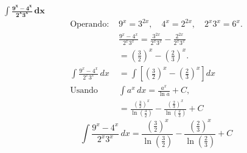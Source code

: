 $\displaystyle \mathbf{\int \frac{9^{x} - 4^{x}}{2^{x}3^{x}}\,dx}$
\nopagebreak
\begin{align*}
\text{Operando: } &9^{x} = 3^{2x}, \quad 4^{x} = 2^{2x}, \quad 2^{x}3^{x}=6^{x}. \\[6pt]
&\frac{9^{x} - 4^{x}}{2^{x}3^{x}}
= \frac{3^{2x}}{2^{x}3^{x}} - \frac{2^{2x}}{2^{x}3^{x}} \\[6pt]
&= \left(\frac{3}{2}\right)^{x} - \left(\frac{2}{3}\right)^{x}. \\[6pt]
\int \frac{9^{x} - 4^{x}}{2^{x}3^{x}}\,dx
&= \int \left[\left(\frac{3}{2}\right)^{x} - \left(\frac{2}{3}\right)^{x}\right] dx \\[6pt]
\text{Usando } &\int a^{x}\,dx = \frac{a^{x}}{\ln a} + C, \\[6pt]
&= \frac{\left(\tfrac{3}{2}\right)^{x}}{\ln\!\left(\tfrac{3}{2}\right)} - \frac{\left(\tfrac{2}{3}\right)^{x}}{\ln\!\left(\tfrac{2}{3}\right)} + C
\end{align*}
\[
\boxed{\displaystyle 
\int \frac{9^{x} - 4^{x}}{2^{x}3^{x}}\,dx
= \frac{\left(\tfrac{3}{2}\right)^{x}}{\ln\!\left(\tfrac{3}{2}\right)} - \frac{\left(\tfrac{2}{3}\right)^{x}}{\ln\!\left(\tfrac{2}{3}\right)} + C}
\]
